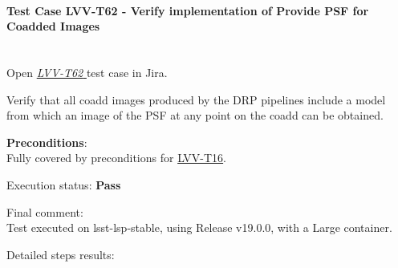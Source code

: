 \documentclass[DM,lsstdraft,STR,toc]{lsstdoc}
\begin{document}
\paragraph{Test Case LVV-T62 -  Verify implementation of Provide PSF for Coadded Images
 }\mbox{}\\

Open  \href{https://jira.lsstcorp.org/secure/Tests.jspa#/testCase/LVV-T62}{\textit{ LVV-T62 } }
test case in Jira.

 Verify that all coadd images produced by the DRP pipelines include a
model from which an image of the PSF at any point on the coadd can be
obtained.


\textbf{ Preconditions}:\\
 Fully covered by preconditions for
\href{https://jira.lsstcorp.org/secure/Tests.jspa\#/testCase/LVV-T16}{LVV-T16}.


Execution status: {\bf Pass }

Final comment:\\ Test executed on lsst-lsp-stable, using Release v19.0.0, with a Large
container.



Detailed steps results:
\end{document}
